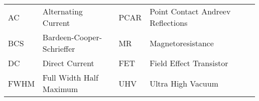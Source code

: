 \begin{abbreviations}


\begin{table}[here]
\centering
\small{
\begin{tabular}{lp{5cm}llp{5cm}ll}
AC    & Alternating Current &       & PCAR   & Point Contact Andreev Reflections \\
BCS   & Bardeen-Cooper-Schrieffer &       & MR    & Magnetoresistance \\
DC    & Direct Current &      & FET   & Field Effect Transistor  \\       
FWHM  & Full Width Half Maximum &      & UHV   & Ultra High Vacuum \\
\end{tabular}
}
\label{tbl:Abbreviations}
\end{table}


\end{abbreviations}
